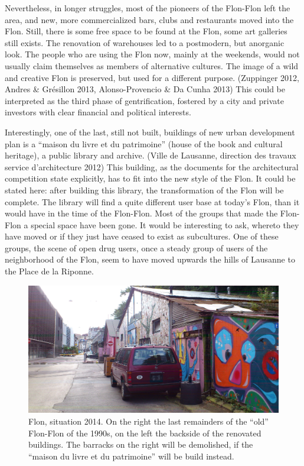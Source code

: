 \documentclass[a4paper,
fontsize=11pt,
oneside,
numbers=noperiodatend,
parskip=half-,
bibliography=totoc,
final
]{scrartcl}
\begin{document}
Nevertheless, in longer struggles, most of the pioneers of the Flon-Flon
left the area, and new, more commercialized bars, clubs and restaurants
moved into the Flon. Still, there is some free space to be found at the
Flon, some art galleries still exists. The renovation of warehouses led
to a postmodern, but anorganic look. The people who are using the Flon
now, mainly at the weekends, would not usually claim themselves as
members of alternative cultures. The image of a wild and creative Flon
is preserved, but used for a different purpose. (Zuppinger 2012, Andres
\& Grésillon 2013, Alonso-Provencio \& Da Cunha 2013) This could be
interpreted as the third phase of gentrification, fostered by a city and
private investors with clear financial and political interests.

Interestingly, one of the last, still not built, buildings of new urban
development plan is a \enquote{maison du livre et du patrimoine} (house
of the book and cultural heritage), a public library and archive. (Ville
de Lausanne, direction des travaux service d'architecture 2012) This
building, as the documents for the architectural competition state
explicitly, has to fit into the new style of the Flon. It could be
stated here: after building this library, the transformation of the Flon
will be complete. The library will find a quite different user base at
today's Flon, than it would have in the time of the Flon-Flon. Most of
the groups that made the Flon-Flon a special space have been gone. It
would be interesting to ask, whereto they have moved or if they just
have ceased to exist as subcultures. One of these groups, the scene of
open drug users, once a steady group of users of the neighborhood of the
Flon, seem to have moved upwards the hills of Lausanne to the Place de
la Riponne.

\begin{figure}[htbp]
\centering
\includegraphics{img/BlumerSchuldt02.jpg}
\caption{Flon, situation 2014. On the right the last remainders of the
\enquote{old} Flon-Flon of the 1990s, on the left the backside of the
renovated buildings. The barracks on the right will be demolished, if
the \enquote{maison du livre et du patrimoine} will be build instead.}
\end{figure}
\end{document}
